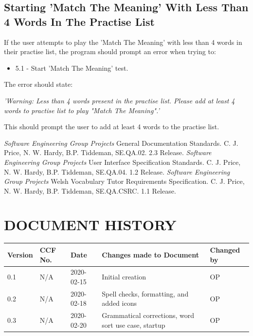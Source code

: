 \documentclass{project}
\begin{document}
\subsection{Starting 'Match The Meaning' With Less Than 4 Words In The Practise List}
If the user attempts to play the 'Match The Meaning' with less than 4 words in their practise list, the program should prompt an error when trying to:
\begin{itemize}
	\item 5.1 - Start 'Match The Meaning' test.
	\end{itemize}
The error should state:
\begin{center}
	\emph{'Warning: Less than 4 words present in the practise list. Please add at least 4 words to practise list to play "Match The Meaning".'}
\end{center}
This should prompt the user to add at least 4 words to the practise list.
\begin{thebibliography}{5}
 \emph{Software Engineering Group Projects}
General Documentation Standards.
C. J. Price, N. W. Hardy, B.P. Tiddeman, SE.QA.02. 2.3 Release.
 \emph{Software Engineering Group Projects}
User Interface Specification Standards.
C. J. Price, N. W. Hardy, B.P. Tiddeman, SE.QA.04. 1.2 Release.
 \emph{Software Engineering Group Projects}
Welsh Vocabulary Tutor Requirements Specification.
C. J. Price, N. W. Hardy, B.P. Tiddeman, SE.QA.CSRC. 1.1 Release.
\end{thebibliography}
\section*{DOCUMENT HISTORY}
\begin{tabular}{|l | l | l | l | l |}
\hline
Version & CCF No. & Date & Changes made to Document & Changed by \\
\hline
0.1 & N/A & 2020-02-15 & Initial creation & OP \\
\hline
0.2 & N/A & 2020-02-18 & Spell checks, formatting, and added icons & OP \\
\hline
0.3 & N/A & 2020-02-20 & Grammatical corrections, word sort use case, startup & OP \\
\hline
\end{tabular}
\label{thelastpage}
\end{document}

